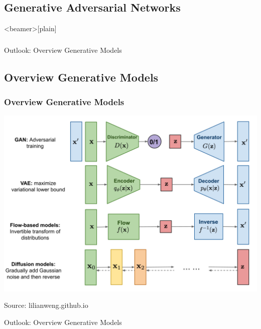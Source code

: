 \documentclass[13pt,compress]{beamer}
\begin{document}
\subsection*{Generative Adversarial Networks}

\begin{frame}<beamer>[plain]
    \frametitle{}
\begin{center}    
\Large{Outlook: Overview Generative Models}
\end{center}
  \end{frame}
\subsection*{Overview Generative Models}
\begin{frame}
    \frametitle{Overview Generative Models}
\includegraphics[width=\textwidth]{generative-overview.png}\\
\hfill \begin{tiny}
Source: lilianweng.github.io
\end{tiny}
\begin{center}    
\Large{Outlook: Overview Generative Models}
\end{center}
  \end{frame}
\end{document}
